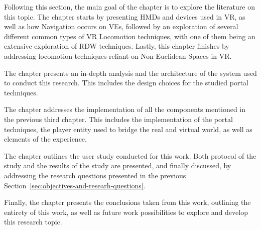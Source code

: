 Following this section, the main goal of the  chapter is to explore the literature on this topic. The chapter starts by presenting
\glspl{HMD} and devices used in \gls{VR}, as well as how Navigation occurs on \glspl{VE}, followed by an exploration of several different 
common types of \gls{VR} Locomotion techniques, with one of them being an extensive exploration of \gls{RDW} techniques. Lastly, this chapter 
finishes by addressing locomotion techniques reliant on Non-Euclidean Spaces in \gls{VR}.

The  chapter presents an in-depth analysis and the architecture of the system used to conduct this research.
This includes the design choices for the studied portal techniques.

The  chapter addresses the implementation of all the components mentioned in the previous third chapter.
This includes the implementation of the portal techniques, the player entity used to bridge the real and virtual world, as well as 
 elements of the experience.

The  chapter outlines the user study conducted for this work. Both protocol of the study and the results of 
the study are presented, and finally discussed, by addressing the research questions presented in the previous Section~\ref{sec:objectives-and-researh-questions}.

Finally, the  chapter presents the conclusions taken from this work, outlining the entirety of this work, as well as 
future work possibilities to explore and develop this research topic.